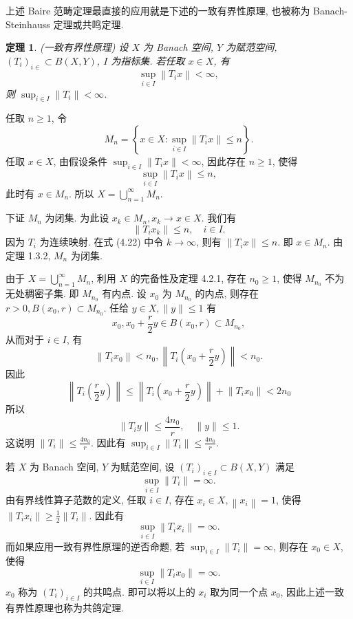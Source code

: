 \documentclass[openany]{ctexbook}
\makeatletter
\theoremstyle{kaiti}
\newtheorem{theorem}{定理}[section]
\theoremstyle{normal}
\renewenvironment{proof}[1][\proofname]{\par
    \pushQED{\qed}%
    \normalfont \topsep6\p@\@plus6\p@\relax
    \trivlist
    \item\relax
    {\heiti #1}\hspace{2\labelsep}\ignorespaces
  }{%
    \popQED\endtrivlist\@endpefalse
  }
\makeatother
\begin{document}
上述 Baire 范畴定理最直接的应用就是下述的一致有界性原理, 也被称为 Banach-Steinhauss 定理或共鸣定理.

\begin{theorem}
(一致有界性原理) 设 $X$ 为 Banach 空间, $Y$ 为赋范空间, $\left(T_{i}\right)_{i \in} \subset B(X, Y)$, $I$ 为指标集. 若任取 $x \in X$, 有
$$
\sup_{i \in I}\left\|T_{i} x\right\|<\infty,
$$
则 $\sup_{i \in I}\left\|T_{i}\right\|<\infty$.
\end{theorem}

\begin{proof}
任取 $n \geqslant 1$, 令
$$
M_n=\left\{x \in X: \sup_{i \in I}\left\|T_{i} x\right\| \leqslant n\right\}.
$$
任取 $x \in X$, 由假设条件 $\sup_{i \in I}\left\|T_{i} x\right\|<\infty$, 因此存在 $n \geqslant 1$, 使得
$$
\sup_{i \in I}\left\|T_{i} x\right\| \leqslant n,
$$
此时有 $x \in M_n$. 所以 $X=\bigcup_{n=1}^{\infty} M_n$.

下证 $M_n$ 为闭集. 为此设 $x_{k} \in M_n, x_{k} \rightarrow x \in X$. 我们有
\begin{equation}
  \left\|T_{i} x_{k}\right\| \leqslant n, \quad i \in I.
\end{equation}
因为 $T_{i}$ 为连续映射. 在式 (4.22) 中令 $k \rightarrow \infty$, 则有 $\left\|T_{i} x\right\| \leqslant n$. 即 $x \in M_n$. 由定理 1.3.2, $M_n$ 为闭集.

由于 $X=\bigcup_{n=1}^{\infty} M_n$, 利用 $X$ 的完备性及定理 4.2.1, 存在 $n_0 \geqslant 1$, 使得 $M_{n_0}$ 不为无处稠密子集. 即 $M_{n_0}$ 有内点. 设 $x_0$ 为 $M_{n_0}$ 的内点, 则存在 $r>0, B\left(x_0, r\right) \subset M_{n_0}$. 任给 $y \in X,\|y\| \leqslant 1$ 有
$$
x_0, x_0+\frac{r}{2} y \in B\left(x_0, r\right) \subset M_{n_0},
$$
从而对于 $i \in I$, 有
$$
\left\|T_{i} x_0\right\|<n_0,\left\|T_{i}\left(x_0+\frac{r}{2} y\right)\right\|<n_0.
$$
因此
$$
\left\|T_{i}\left(\frac{r}{2} y\right)\right\| \leqslant\left\|T_{i}\left(x_0+\frac{r}{2} y\right)\right\|+\left\|T_{i} x_0\right\|<2 n_0
$$
所以
$$
\left\|T_{i} y\right\| \leqslant \frac{4 n_0}{r}, \quad\|y\| \leqslant 1.
$$
这说明 $\left\|T_{i}\right\| \leqslant \frac{4 n_0}{r}$. 因此有 $\sup_{i \in I}\left\|T_{i}\right\| \leqslant \frac{4 n_0}{r}$.
\end{proof}

若 $X$ 为 Banach 空间, $Y$ 为赋范空间, 设 $\left(T_{i}\right)_{i \in I} \subset B(X, Y)$ 满足
$$
\sup_{i \in I}\left\|T_{i}\right\|=\infty.
$$
由有界线性算子范数的定义, 任取 $i \in I$, 存在 $x_{i} \in X,\left\|x_{i}\right\|=1$, 使得 $\left\|T_{i} x_{i}\right\| \geqslant \frac{1}{2}\left\|T_{i}\right\|$. 因此有
$$
\sup_{i \in I}\left\|T_{i} x_{i}\right\|=\infty.
$$
而如果应用一致有界性原理的逆否命题, 若 $\sup_{i \in I}\left\|T_{i}\right\|=\infty$, 则存在 $x_0 \in X$, 使得
$$
\sup_{i \in I}\left\|T_{i} x_0\right\|=\infty.
$$
$x_0$ 称为 $\left(T_{i}\right)_{i \in I}$ 的共鸣点. 即可以将以上的 $x_{i}$ 取为同一个点 $x_0$, 因此上述一致有界性原理也称为共鸽定理.
\end{document}
